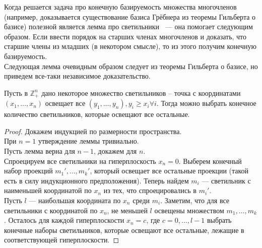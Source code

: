 Когда решается задача про конечную базируемость множества многочленов (например, доказывается существование базиса Грёбнера из теоремы Гильберта о базисе) полезной является лемма про светильники ~--- она помогает следующим образом.
Если ввести порядок на старших членах многочленов и доказать, что старшие члены из младших (в некотором смысле), то из этого получим конечную базируемость.\\
Следующая лемма очевидным образом следует из теоремы Гильберта о базисе, но приведем все-таки независимое доказательство.
\vskip 0.1in\noindent
\begin{lemma}
    \label{lamp}
    Пусть в $\mathbb{Z}_+^n$ дано некоторое множество светильников -- точка с координатами $(x_1,\ldots,x_n)$ освещает все $(y_1,\ldots,y_n), y_i\geq x_i \forall i$.
    Тогда можно выбрать конечное количество светильников, которые освещают все остальные.
\end{lemma}
\begin{proof}
    Докажем индукцией по размерности пространства.\\
    При $n=1$ утверждение леммы тривиально.\\
    Пусть лемма верна для $n-1$, докажем для $n$. \\
    Спроецируем все светильники на гиперплоскость $x_n=0$.
    Выберем конечный набор проекций $m_1',\ldots,m_k'$, который освещает все остальные проекции (такой есть в силу индукционного предположения).
    Теперь найдем $m_i$ --- светильник с наименьшей координатой по $x_n$ из тех, что спроецировались в $m_i'$.\\
    Пусть $l$ --- наибольшая координата по $x_n$ среди $m_i$.
    Заметим, что для все светильники с координатой по $x_n$, не меньшей $l$ освещены множеством $m_1,\ldots,m_k$.
    Осталось для каждой гиперплоскости $x_n=c$, где $c=0,\ldots,l-1$ выбрать конечные наборы светильников, которые освещают все остальные, лежащие в соответствующей гиперплоскости.
\end{proof}

